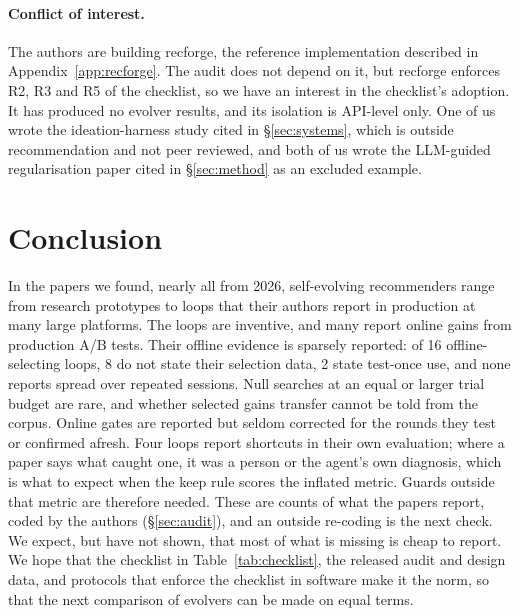 \documentclass[sigconf,nonacm]{acmart}
\begin{document}
\paragraph{Conflict of interest.} The authors are building recforge, the reference implementation described in
Appendix~\ref{app:recforge}. The audit does not depend on it, but recforge enforces R2, R3 and R5 of the checklist, so
we have an interest in the checklist's adoption. It has produced no evolver results, and its isolation is API-level only. One of us wrote the ideation-harness study cited in
\S\ref{sec:systems}, which is outside recommendation and not peer reviewed, and both of us wrote the LLM-guided
regularisation paper cited in \S\ref{sec:method} as an excluded example.

\section{Conclusion}

In the papers we found, nearly all from 2026, self-evolving recommenders range from research prototypes to loops
that their authors report in production at many large platforms. The loops are inventive, and many report online gains from production A/B tests.
Their offline evidence is sparsely reported: of 16 offline-selecting loops, 8 do not state their selection data, 2
state test-once use, and none reports spread over repeated sessions. Null searches at an equal or larger trial budget
are rare, and whether selected gains transfer cannot be told from the corpus. Online gates are reported but seldom
corrected for the rounds they test or confirmed afresh. Four loops report shortcuts in their own evaluation; where a
paper says what caught one, it was a person or the agent's own diagnosis, which is what to expect when the keep rule
scores the inflated metric. Guards outside that metric are therefore needed. These are counts of what the papers
report, coded by the authors (\S\ref{sec:audit}), and an outside re-coding is the next check. We expect, but have not
shown, that most of what is missing is cheap to report. We hope that the checklist in Table~\ref{tab:checklist}, the
released audit and design data, and protocols that enforce the checklist in software make it the norm, so that the
next comparison of evolvers can be made on equal terms.



\end{document}
